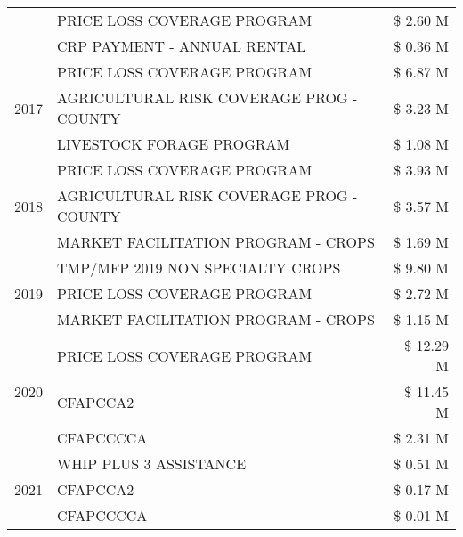 \begin{tabular}{llr}
 & PRICE LOSS COVERAGE PROGRAM & \$ 2.60 M \\
 & CRP PAYMENT - ANNUAL RENTAL & \$ 0.36 M \\
\cline{1-3}
\multirow[t]{3}{*}{2017} & PRICE LOSS COVERAGE PROGRAM & \$ 6.87 M \\
 & AGRICULTURAL RISK COVERAGE PROG - COUNTY & \$ 3.23 M \\
 & LIVESTOCK FORAGE PROGRAM & \$ 1.08 M \\
\cline{1-3}
\multirow[t]{3}{*}{2018} & PRICE LOSS COVERAGE PROGRAM & \$ 3.93 M \\
 & AGRICULTURAL RISK COVERAGE PROG - COUNTY & \$ 3.57 M \\
 & MARKET FACILITATION PROGRAM - CROPS & \$ 1.69 M \\
\cline{1-3}
\multirow[t]{3}{*}{2019} & TMP/MFP 2019 NON SPECIALTY CROPS & \$ 9.80 M \\
 & PRICE LOSS COVERAGE PROGRAM & \$ 2.72 M \\
 & MARKET FACILITATION PROGRAM - CROPS & \$ 1.15 M \\
\cline{1-3}
\multirow[t]{3}{*}{2020} & PRICE LOSS COVERAGE PROGRAM & \$ 12.29 M \\
 & CFAPCCA2 & \$ 11.45 M \\
 & CFAPCCCCA & \$ 2.31 M \\
\cline{1-3}
\multirow[t]{3}{*}{2021} & WHIP PLUS 3 ASSISTANCE & \$ 0.51 M \\
 & CFAPCCA2 & \$ 0.17 M \\
 & CFAPCCCCA & \$ 0.01 M \\
\cline{1-3}
\bottomrule
\end{tabular}
